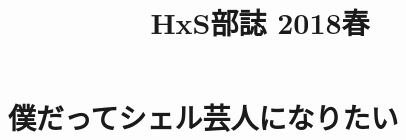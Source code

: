 \documentclass[10.5pt,a4paper]{jsbook}
\title{HxS部誌 2018春}
\date{}
\begin{document}
\maketitle
\tableofcontents
\chapter{僕だってシェル芸人になりたい}

\end{document}
